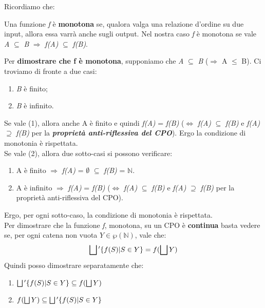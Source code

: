 {
	Ricordiamo che:
	\begin{mydef}
	Una funzione \textit{f} è \textbf{monotona} se, qualora valga una relazione d'ordine su due input, allora essa varrà anche sugli output. Nel nostra caso \textit{f} è monotona se vale \textit{A} $\subseteq$ \textit{B} $\Rightarrow$ \textit{f(A)} $\subseteq$ \textit{f(B)}.
	\end{mydef}

	Per \textbf{dimostrare che f è monotona}, supponiamo che \textit{A} $\subseteq$ \textit{B} ($\Rightarrow$ \textbar A\textbar{} $\leq$ \textbar B\textbar{}). Ci troviamo di fronte a due casi:
	\begin{enumerate}
		\item \textit{B} è finito;
		\item \textit{B} è infinito.
	\end{enumerate}
	
	Se vale (1), allora anche 
	\textbar A\textbar{} è finito e quindi \textit{f(A)} = \textit{f(B)} ($\iff$ \textit{f(A)} $\subseteq$ \textit{f(B)} e \textit{f(A)} $\supseteq$ \textit{f(B)} per la \textit{\textbf{proprietà anti-riflessiva del CPO}}). Ergo la condizione di monotonia è rispettata.\\
	
	Se vale (2), allora due sotto-casi si possono verificare:
	\begin{enumerate}
		\item A è finito $\Rightarrow$ \textit{f(A)} = $\emptyset$ $\subseteq$ \textit{ f(B)} = $\mathbb{N}$.
		\item A è infinito $\Rightarrow$ \textit{f(A)} = \textit{f(B)} ($\iff$ \textit{f(A)} $\subseteq$ \textit{f(B)} e \textit{f(A)} $\supseteq$ \textit{f(B)} per la proprietà anti-riflessiva del CPO).
	\end{enumerate}
	
	Ergo, per ogni sotto-caso, la condizione di monotonia è rispettata.\\


    Per dimostrare che la funzione \textit{f}, monotona, su un CPO è 
    \textbf{continua} basta vedere se, per ogni catena non vuota 
    $Y\in\wp{(\mathbb{N})}$, vale che:
    \[\bigsqcup{}' \{f(S) | S \in{}Y\} = f(\bigsqcup{}Y)\]
    Quindi posso dimostrare separatamente che:
    \begin{enumerate}
    \item $\bigsqcup{}' \{f(S) | S \in{}Y\} \subseteq f(\bigsqcup{}Y)$
    \item $f(\bigsqcup{}Y) \subseteq \bigsqcup{}' \{f(S) | S \in{}Y\}$
    \end{enumerate}

}
